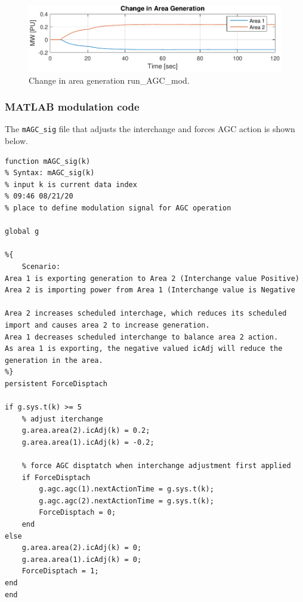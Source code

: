 \begin{figure}[H]
	\centering
	\footnotesize
	\includegraphics[width=\linewidth]{examples/agcMod/changeGen}
	\caption{Change in area generation run\_AGC\_mod.}
	\label{fig: AGCmod change in gen}
\end{figure}%

\pagebreak
\subsubsection{MATLAB modulation code} 
The \verb|mAGC_sig| file that adjusts the interchange and forces AGC action is shown below.

\begin{verbatim}
function mAGC_sig(k)
% Syntax: mAGC_sig(k)
% input k is current data index
% 09:46 08/21/20
% place to define modulation signal for AGC operation

global g

%{
    Scenario:
Area 1 is exporting generation to Area 2 (Interchange value Positive)
Area 2 is importing power from Area 1 (Interchange value is Negative

Area 2 increases scheduled interchage, which reduces its scheduled import and causes area 2 to increase generation.
Area 1 decreases scheduled interchange to balance area 2 action.
As area 1 is exporting, the negative valued icAdj will reduce the generation in the area.
%}
persistent ForceDisptach

if g.sys.t(k) >= 5
    % adjust iterchange 
    g.area.area(2).icAdj(k) = 0.2;
    g.area.area(1).icAdj(k) = -0.2;
    
    % force AGC disptatch when interchange adjustment first applied
    if ForceDisptach
        g.agc.agc(1).nextActionTime = g.sys.t(k);
        g.agc.agc(2).nextActionTime = g.sys.t(k);
        ForceDisptach = 0;
    end 
else
    g.area.area(2).icAdj(k) = 0;
    g.area.area(1).icAdj(k) = 0;
    ForceDisptach = 1;
end
end
\end{verbatim}
